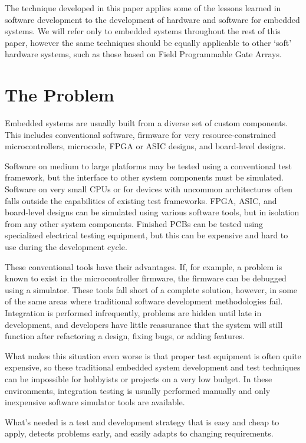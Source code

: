 \documentclass[letterpaper,twocolumn]{article}
\begin{document}
The technique developed in this paper applies some of the lessons learned in software development
to the development of hardware and software for embedded systems. We will refer only to embedded
systems throughout the rest of this paper, however the same techniques should be equally applicable to
other `soft' hardware systems, such as those based on Field Programmable Gate Arrays.

\section{The Problem}

Embedded systems are usually built from a diverse set of custom components. This includes
conventional software, firmware for very resource-constrained microcontrollers, microcode,
FPGA or ASIC designs, and board-level designs.

Software on medium to large platforms may be tested using a conventional test framework,
but the interface to other system components must be simulated. Software on very small
CPUs or for devices with uncommon architectures often falls outside the capabilities of
existing test frameworks. FPGA, ASIC, and board-level designs can be simulated using various
software tools, but in isolation from any other system components. Finished PCBs can be tested
using specialized electrical testing equipment, but this can be expensive and hard to use
during the development cycle.

These conventional tools have their advantages. If, for example, a problem is known
to exist in the microcontroller firmware, the firmware can be debugged using a simulator.
These tools fall short of a complete solution, however, in some of the same areas where traditional
software development methodologies fail. Integration is performed infrequently, problems are
hidden until late in development, and developers have little reassurance that the system will
still function after refactoring a design, fixing bugs, or adding features.

What makes this situation even worse is that proper test equipment is often quite expensive,
so these traditional embedded system development and test techniques can be impossible for
hobbyists or projects on a very low budget. In these environments, integration testing is
usually performed manually and only inexpensive software simulator tools are available.

What's needed is a test and development strategy that is easy and cheap to apply, detects
problems early, and easily adapts to changing requirements.
\end{document}
